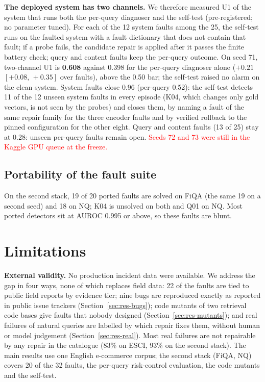 \documentclass[conference]{IEEEtran}
\newcommand{\ci}[2]{[#1,\,#2]}
\newcommand{\PEND}[1]{\textcolor{red}{#1}}
\begin{document}
\textbf{The deployed system has two channels.} We therefore measured U1 of the system that runs both the per-query diagnoser and the self-test (pre-registered; no parameter tuned). For each of the 12 system faults among the 25, the self-test runs on the faulted system with a fault dictionary that does not contain that fault; if a probe fails, the candidate repair is applied after it passes the finite battery check; query and content faults keep the per-query outcome. On seed 71, two-channel U1 is \textbf{0.608} against 0.398 for the per-query diagnoser alone ($+0.21$ $\ci{+0.08}{+0.35}$ over faults), above the 0.50 bar; the self-test raised no alarm on the clean system. System faults close 0.96 (per-query 0.52): the self-test detects 11 of the 12 unseen system faults in every episode (K04, which changes only gold vectors, is not seen by the probes) and closes them, by naming a fault of the same repair family for the three encoder faults and by verified rollback to the pinned configuration for the other eight. Query and content faults (13 of 25) stay at 0.28: unseen per-query faults remain open. \PEND{Seeds 72 and 73 were still in the Kaggle GPU queue at the freeze.}

\subsection{Portability of the fault suite}
On the second stack, 19 of 20 ported faults are solved on FiQA (the same 19 on a second seed) and 18 on NQ; K04 is unsolved on both and Q01 on NQ. Most ported detectors sit at AUROC 0.995 or above, so these faults are blunt.

\section{Limitations}\label{sec:limits}
\textbf{External validity.} No production incident data were available. We address the gap in four ways, none of which replaces field data: 22 of the faults are tied to public field reports by evidence tier; nine bugs are reproduced exactly as reported in public issue trackers (Section~\ref{sec:res-bugs}); code mutants of two retrieval code bases give faults that nobody designed (Section~\ref{sec:res-mutants}); and real failures of natural queries are labelled by which repair fixes them, without human or model judgement (Section~\ref{sec:res-real}). Most real failures are not repairable by any repair in the catalogue (83\% on ESCI, 93\% on the second stack). The main results use one English e-commerce corpus; the second stack (FiQA, NQ) covers 20 of the 32 faults, the per-query risk-control evaluation, the code mutants and the self-test.
\end{document}
